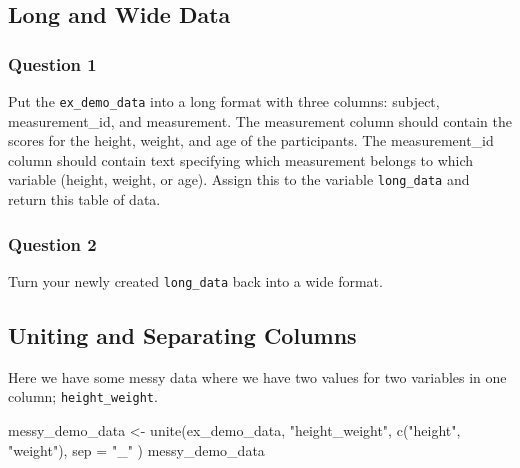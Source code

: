 \documentclass[
]{book}
\newenvironment{Shaded}{\begin{snugshade}}{\end{snugshade}}
\newcommand{\AttributeTok}[1]{\textcolor[rgb]{0.77,0.63,0.00}{#1}}
\newcommand{\FunctionTok}[1]{\textcolor[rgb]{0.00,0.00,0.00}{#1}}
\newcommand{\NormalTok}[1]{#1}
\newcommand{\OtherTok}[1]{\textcolor[rgb]{0.56,0.35,0.01}{#1}}
\newcommand{\StringTok}[1]{\textcolor[rgb]{0.31,0.60,0.02}{#1}}
\begin{document}
\hypertarget{long-and-wide-data}{%
\subsection{Long and Wide Data}\label{long-and-wide-data}}

\hypertarget{question-1-3}{%
\subsubsection{Question 1}\label{question-1-3}}

Put the \texttt{ex\_demo\_data} into a long format with three columns: subject, measurement\_id, and measurement. The measurement column should contain the scores for the height, weight, and age of the participants. The measurement\_id column should contain text specifying which measurement belongs to which variable (height, weight, or age). Assign this to the variable \texttt{long\_data} and return this table of data.

\hypertarget{question-2-3}{%
\subsubsection{Question 2}\label{question-2-3}}

Turn your newly created \texttt{long\_data} back into a wide format.

\hypertarget{uniting-and-separating-columns}{%
\subsection{Uniting and Separating Columns}\label{uniting-and-separating-columns}}

Here we have some messy data where we have two values for two variables in one column; \texttt{height\_weight}.

\begin{Shaded}
\begin{Highlighting}[]
\NormalTok{messy\_demo\_data }\OtherTok{\textless{}{-}} \FunctionTok{unite}\NormalTok{(ex\_demo\_data, }
                         \StringTok{"height\_weight"}\NormalTok{, }
                         \FunctionTok{c}\NormalTok{(}\StringTok{"height"}\NormalTok{, }\StringTok{"weight"}\NormalTok{), }
                         \AttributeTok{sep =} \StringTok{"\_"}
\NormalTok{                         )}
\NormalTok{messy\_demo\_data}
\end{Highlighting}
\end{Shaded}
\end{document}
